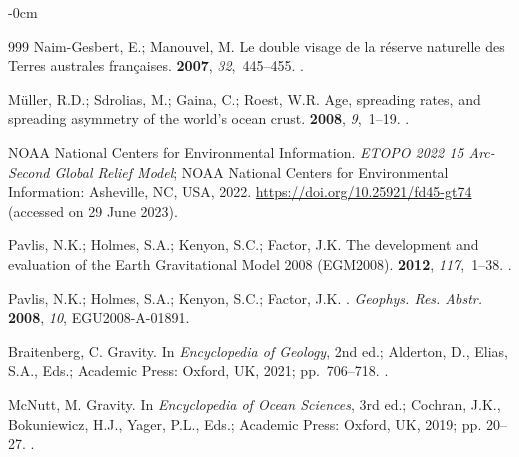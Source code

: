 \documentclass[geomatics,article,accept,pdftex,moreauthors]{Definitions/mdpi}
\begin{document}
\begin{adjustwidth}{-\extralength}{0cm}
\begin{thebibliography}{999}
Naim-Gesbert, E.; Manouvel, M.
\newblock Le double visage de la réserve naturelle des Terres australes
  françaises.
 {\bf 2007}, {\em
  32},~445--455.
.

Müller, R.D.; Sdrolias, M.; Gaina, C.; Roest, W.R.
\newblock Age, spreading rates, and spreading asymmetry of the world's ocean
  crust.
 {\bf 2008}, \emph{9},~1--19. %
.

{NOAA National Centers for Environmental Information}.
\newblock \emph{ETOPO 2022 15 Arc-Second Global Relief Model};
\newblock NOAA National Centers for Environmental Information: Asheville, NC, USA, 2022. %
\newblock \url{https://doi.org/10.25921/fd45-gt74}  (accessed on 29 June 2023).

Pavlis, N.K.; Holmes, S.A.; Kenyon, S.C.; Factor, J.K.
\newblock The development and evaluation of the Earth Gravitational Model 2008
  (EGM2008).
 {\bf 2012}, \emph{117},~1--38. %
.

Pavlis, N.K.; Holmes, S.A.; Kenyon, S.C.; Factor, J.K.
.
\newblock \emph{Geophys. Res. Abstr.} \textbf{2008}, \emph{10}, EGU2008-A-01891. %


Braitenberg, C.
\newblock Gravity. In {\em Encyclopedia of Geology}, 2nd ed.;  Alderton, D., Elias, S.A., Eds.; Academic Press: Oxford,  UK, 2021;
  pp.~706--718.
.

McNutt, M.
\newblock Gravity. In {\em Encyclopedia of Ocean Sciences}, 3rd ed.;  Cochran, J.K., Bokuniewicz, H.J., Yager, P.L., Eds.;
  Academic Press: Oxford,  UK, 2019; pp. 20--27.
.


\end{thebibliography}
\end{adjustwidth}
\end{document}
